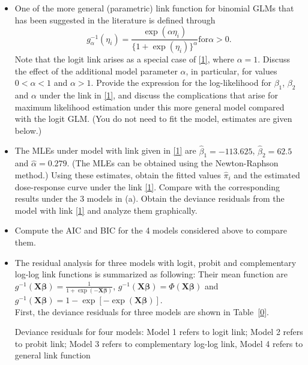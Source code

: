 \documentclass[]{article}
\begin{document}
\begin{enumerate}
{\begin{itemize}
        	\item[(b)] One of the more general (parametric) link function for binomial GLMs that has been suggested in the literature is defined through
        	\begin{equation}
        	g_\alpha^{-1}(\eta_i) = \frac{\exp(\alpha\eta_i)}{\{1+\exp(\eta_i)\}^\alpha} \mathrm{ for } \alpha>0.
        	\label{1}
        	\end{equation}
        	Note that the logit link arises as a special case of \ref{1}, where $\alpha = 1$. Discuss the effect of the additional model parameter $\alpha$, in particular, for values $0<\alpha<1$ and $\alpha>1$. Provide the expression for the log-likelihood for $\beta_1$, $\beta_2$ and $\alpha$ under the link in \ref{1}, and discuss the complications that arise for maximum likelihood estimation under this more general model compared with the logit GLM. (You do not need to fit the model, estimates are given below.)
        	\item[(c)] The MLEs under model with link given in \ref{1} are $\hat{\beta}_1 = -113.625$, $\hat{\beta}_2 = 62.5$ and $\hat{\alpha} = 0.279$. (The MLEs can be obtained using the Newton-Raphson method.) Using these estimates, obtain the fitted values $\hat{\pi}_i$ and the estimated dose-response curve under the link \ref{1}. Compare with the corresponding results under the 3 models in (a). Obtain the deviance residuals from the model with link \ref{1} and analyze them graphically.
        	\item Compute the AIC and BIC for the 4 models considered above to compare them.
        \end{itemize}
        \item[Sol 1]
        \begin{itemize}
        	\item[(a)] 
        	The residual analysis for three models with logit, probit and complementary log-log link functions is summarized as following: Their mean function are $g^{-1}(\bm{X}\bm{\beta}) = \frac{1}{1+\exp(-\bm{X}\bm{\beta})}$, $g^{-1}(\bm{X}\bm{\beta}) = \Phi(\bm{X}\bm{\beta})$ and $g^{-1}(\bm{X}\bm{\beta}) = 1 - \exp[-\exp(\bm{X}\bm{\beta})]$.\\
        	First, the deviance residuals for three models are shown in Table~\ref{0}.\par
        	\begin{table}[ht!]
        		\centering
        		\caption{Deviance residuals for four models: Model 1 refers to logit link; Model 2 refers to probit link; Model 3 refers to complementary log-log link, Model 4 refers to general link function}

\end{table}
\end{itemize}}
\end{enumerate}
\end{document}
